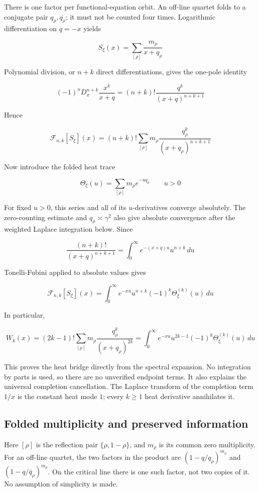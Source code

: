 \documentclass[
  11pt,
]{book}
\begin{document}
There is one factor per functional-equation orbit. An off-line quartet
folds to a conjugate pair \(q_\rho,\overline{q_\rho}\); it must not be
counted four times. Logarithmic differentiation on \(q=-x\) yields

\[
S_\xi(x)=\sum_{[\rho]}\frac{m_\rho}{x+q_\rho}
\tag{32.1}
\]

Polynomial division, or \(n+k\) direct differentiations, gives the
one-pole identity

\[
(-1)^nD_x^{n+k}\frac{x^k}{x+q}
=(n+k)!\frac{q^k}{(x+q)^{n+k+1}}
\]

Hence

\[
\boxed{
\mathcal F_{n,k}[S_\xi](x)
=(n+k)!
\sum_{[\rho]}m_\rho
\frac{q_\rho^k}{(x+q_\rho)^{n+k+1}}
}
\tag{32.2}
\]

Now introduce the folded heat trace

\[
\Theta_\xi(u)=\sum_{[\rho]}m_\rho e^{-uq_\rho}
\qquad u>0
\]

For fixed \(u>0\), this series and all of its \(u\)-derivatives converge
absolutely. The zero-counting estimate and \(q_\rho\asymp\gamma^2\) also
give absolute convergence after the weighted Laplace integration below.
Since

\[
\frac{(n+k)!}{(x+q)^{n+k+1}}
=\int_0^\infty e^{-(x+q)u}u^{n+k}\,du
\]

Tonelli-Fubini applied to absolute values gives

\[
\boxed{
\mathcal F_{n,k}[S_\xi](x)
=\int_0^\infty
e^{-xu}u^{n+k}(-1)^k\Theta_\xi^{(k)}(u)\,du
}
\tag{32.3}
\]

In particular,

\[
\boxed{
W_k(x)
=(2k-1)!
\sum_{[\rho]}m_\rho
\frac{q_\rho^k}{(x+q_\rho)^{2k}}
=\int_0^\infty e^{-xu}u^{2k-1}
(-1)^k\Theta_\xi^{(k)}(u)\,du
}
\tag{32.4}
\]

This proves the heat bridge directly from the spectral expansion. No
integration by parts is used, so there are no unverified endpoint terms.
It also explains the universal completion cancellation. The Laplace
transform of the completion term \(1/x\) is the constant heat mode
\(1\); every \(k\ge1\) heat derivative annihilates it.

\subsection{Folded multiplicity and preserved
information}\label{folded-multiplicity-and-preserved-information}

Here \([\rho]\) is the reflection pair \(\{\rho,1-\rho\}\), and
\(m_\rho\) is its common zero multiplicity. For an off-line quartet, the
two factors in the product are \((1-q/q_\rho)^{m_\rho}\) and
\((1-q/\bar q_\rho)^{m_\rho}\). On the critical line there is one such
factor, not two copies of it. No assumption of simplicity is made.
\end{document}
